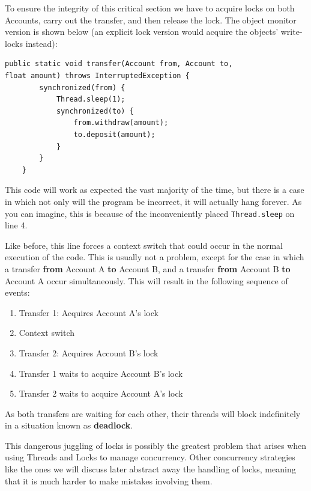 \documentclass[a4paper,12pt]{kth-mag}
\begin{document}
To ensure the integrity of this critical section we have to acquire locks on both Accounts, carry out the transfer, and then release the lock. The object monitor version is shown below (an explicit lock version would acquire the objects' write-locks instead):

\begin{listing}[H]
	\begin{verbatim}
public static void transfer(Account from, Account to,
float amount) throws InterruptedException {
        synchronized(from) {
            Thread.sleep(1);
            synchronized(to) {
                from.withdraw(amount);
                to.deposit(amount);
            }
        }
    }
	\end{verbatim}
\end{listing}

This code will work as expected the vast majority of the time, but there is a case in which not only will the program be incorrect, it will actually hang forever. As you can imagine, this is because of the inconveniently placed \texttt{Thread.sleep} on line 4. 

Like before, this line forces a context switch that could occur in the normal execution of the code. This is usually not a problem, except for the case in which a transfer \textbf{from} Account A \textbf{to} Account B, and a transfer \textbf{from} Account B \textbf{to} Account A occur simultaneously. This will result in the following sequence of events:

\begin{enumerate}
\item Transfer 1: Acquires Account A's lock
\item Context switch
\item Transfer 2: Acquires Account B's lock
\item Transfer 1 waits to acquire Account B's lock
\item Transfer 2 waits to acquire Account A's lock
\end{enumerate}

As both transfers are waiting for each other, their threads will block indefinitely in a situation known as \textbf{deadlock}.

This dangerous juggling of locks is possibly the greatest problem that arises when using Threads and Locks to manage concurrency. Other concurrency strategies like the ones we will discuss later abstract away the handling of locks, meaning that it is much harder to make mistakes involving them.
\end{document}
